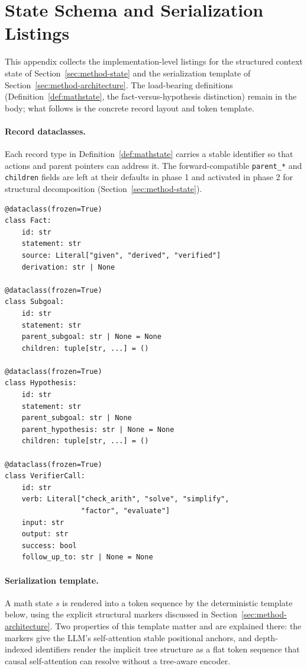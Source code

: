 \section{State Schema and Serialization Listings}
\label{app:state-listings}

This appendix collects the implementation-level listings for the
structured context state of Section~\ref{sec:method-state} and the
serialization template of Section~\ref{sec:method-architecture}. The
load-bearing definitions (Definition~\ref{def:mathstate}, the
fact-versus-hypothesis distinction) remain in the body; what follows is
the concrete record layout and token template.

\paragraph{Record dataclasses.}
Each record type in Definition~\ref{def:mathstate} carries a stable
identifier so that actions and parent pointers can address it. The
forward-compatible \texttt{parent\_*} and \texttt{children} fields are
left at their defaults in phase 1 and activated in phase 2 for
structural decomposition (Section~\ref{sec:method-state}).

\begin{lstlisting}
@dataclass(frozen=True)
class Fact:
    id: str
    statement: str
    source: Literal["given", "derived", "verified"]
    derivation: str | None

@dataclass(frozen=True)
class Subgoal:
    id: str
    statement: str
    parent_subgoal: str | None = None
    children: tuple[str, ...] = ()

@dataclass(frozen=True)
class Hypothesis:
    id: str
    statement: str
    parent_subgoal: str | None
    parent_hypothesis: str | None = None
    children: tuple[str, ...] = ()

@dataclass(frozen=True)
class VerifierCall:
    id: str
    verb: Literal["check_arith", "solve", "simplify",
                  "factor", "evaluate"]
    input: str
    output: str
    success: bool
    follow_up_to: str | None = None
\end{lstlisting}

\paragraph{Serialization template.}
A math state $s$ is rendered into a token sequence by the deterministic
template below, using the explicit structural markers discussed in
Section~\ref{sec:method-architecture}. Two properties of this template
matter and are explained there: the markers give the LLM's
self-attention stable positional anchors, and depth-indexed identifiers
render the implicit tree structure as a flat token sequence that causal
self-attention can resolve without a tree-aware encoder.

